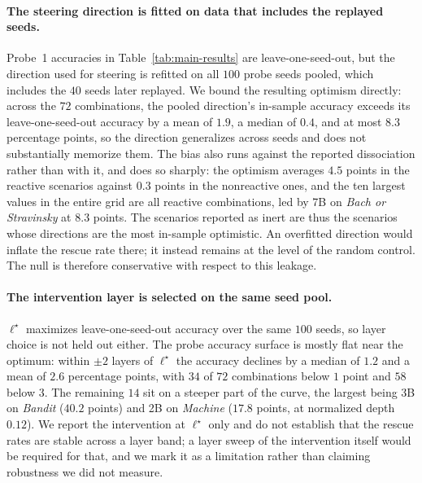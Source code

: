 \paragraph{The steering direction is fitted on data that includes the replayed
seeds.}
Probe~1 accuracies in Table~\ref{tab:main-results} are leave-one-seed-out, but
the direction used for steering is refitted on all \(100\) probe seeds pooled,
which includes the \(40\) seeds later replayed. We bound the resulting optimism
directly: across the \(72\) combinations, the pooled direction's in-sample
accuracy exceeds its leave-one-seed-out accuracy by a mean of \(1.9\), a median
of \(0.4\), and at most \(8.3\) percentage points, so the direction generalizes
across seeds and does not substantially memorize them. The bias also runs
against the reported dissociation rather than with it, and does so sharply: the
optimism averages \(4.5\) points in the reactive scenarios against \(0.3\)
points in the nonreactive ones, and the ten largest values in the entire grid
are all reactive combinations, led by  7B on \textit{Bach or
Stravinsky} at \(8.3\) points. The scenarios reported as inert are thus the
scenarios whose directions are the most in-sample optimistic. An overfitted
direction would inflate the rescue rate there; it instead remains at the level
of the random control. The null is therefore conservative with respect to this
leakage.

\paragraph{The intervention layer is selected on the same seed pool.}
\(\ell^\star\) maximizes leave-one-seed-out accuracy over the same \(100\)
seeds, so layer choice is not held out either. The probe accuracy surface is
mostly flat near the optimum: within \(\pm2\) layers of \(\ell^\star\) the
accuracy declines by a median of \(1.2\) and a mean of \(2.6\) percentage
points, with \(34\) of \(72\) combinations below \(1\) point and \(58\) below
\(3\). The remaining \(14\) sit on a steeper part of the curve, the largest
being  3B on \textit{Bandit} (\(40.2\) points) and
 2B on \textit{Machine} (\(17.8\) points, at normalized depth
\(0.12\)). We report the intervention at \(\ell^\star\) only and do not
establish that the rescue rates are stable across a layer band; a layer sweep of
the intervention itself would be required for that, and we mark it as a
limitation rather than claiming robustness we did not measure.

